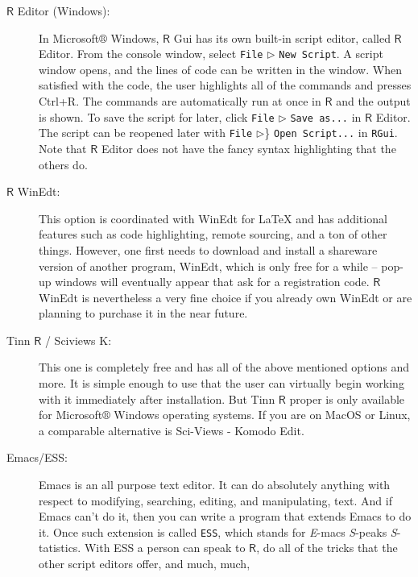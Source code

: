 \begin{description}
\item[{\(\mathsf{R}\) Editor (Windows):}]  In Microsoft\(\circledR\) Windows,
\(\mathsf{R}\) Gui has its own built-in script editor, called
\(\mathsf{R}\) Editor. From the console window, select \texttt{File}
\(\triangleright\) \texttt{New Script}. A script window opens, and the
lines of code can be written in the window. When satisfied with
the code, the user highlights all of the commands and presses
\textsf{Ctrl+R}. The commands are automatically run at once in
\(\mathsf{R}\) and the output is shown. To save the script for
later, click \texttt{File} \(\triangleright\) \texttt{Save as...} in
\(\mathsf{R}\) Editor. The script can be reopened later with
\texttt{File} \(\triangleright\)\} \texttt{Open Script...} in \texttt{RGui}. Note that
\(\mathsf{R}\) Editor does not have the fancy syntax highlighting
that the others do.
\item[{\(\mathsf{R}\) WinEdt:}] 
This option is coordinated with WinEdt for \LaTeX{} and has
additional features such as code highlighting, remote sourcing,
and a ton of other things. However, one first needs to download
and install a shareware version of another program, WinEdt, which
is only free for a while -- pop-up windows will eventually appear
that ask for a registration code. \(\mathsf{R}\) WinEdt is
nevertheless a very fine choice if you already own WinEdt or are
planning to purchase it in the near future.
\item[{Tinn \(\mathsf{R}\) / Sciviews K:}]  This one is completely free and
has all of the above mentioned options and more. It is simple
enough to use that the user can virtually begin working with it
immediately after installation. But Tinn \(\mathsf{R}\) proper is
only available for Microsoft\(\circledR\) Windows operating
systems. If you are on MacOS or Linux, a comparable alternative
is Sci-Views - Komodo Edit.
\item[{Emacs/ESS:}]  Emacs is an all
purpose text editor. It can do absolutely anything
with respect to modifying, searching, editing, and
manipulating, text. And if Emacs can't do it, then you
can write a program that extends Emacs to do it. Once
such extension is called \texttt{ESS}, which stands for
\emph{E}-macs \emph{S}-peaks \emph{S}-tatistics. With ESS a person
can speak to \(\mathsf{R}\), do all of the tricks that
the other script editors offer, and much, much,

\end{description}
